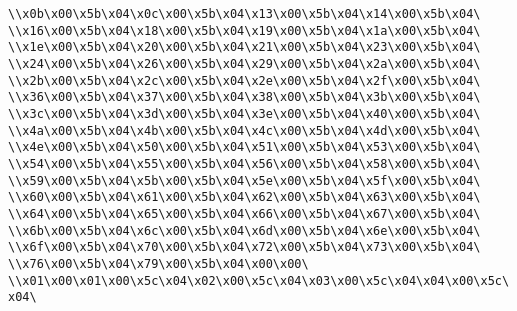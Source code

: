 \verb|\\x0b\x00\x5b\x04\x0c\x00\x5b\x04\x13\x00\x5b\x04\x14\x00\x5b\x04\|\newline
\verb|\\x16\x00\x5b\x04\x18\x00\x5b\x04\x19\x00\x5b\x04\x1a\x00\x5b\x04\|\newline
\verb|\\x1e\x00\x5b\x04\x20\x00\x5b\x04\x21\x00\x5b\x04\x23\x00\x5b\x04\|\newline
\verb|\\x24\x00\x5b\x04\x26\x00\x5b\x04\x29\x00\x5b\x04\x2a\x00\x5b\x04\|\newline
\verb|\\x2b\x00\x5b\x04\x2c\x00\x5b\x04\x2e\x00\x5b\x04\x2f\x00\x5b\x04\|\newline
\verb|\\x36\x00\x5b\x04\x37\x00\x5b\x04\x38\x00\x5b\x04\x3b\x00\x5b\x04\|\newline
\verb|\\x3c\x00\x5b\x04\x3d\x00\x5b\x04\x3e\x00\x5b\x04\x40\x00\x5b\x04\|\newline
\verb|\\x4a\x00\x5b\x04\x4b\x00\x5b\x04\x4c\x00\x5b\x04\x4d\x00\x5b\x04\|\newline
\verb|\\x4e\x00\x5b\x04\x50\x00\x5b\x04\x51\x00\x5b\x04\x53\x00\x5b\x04\|\newline
\verb|\\x54\x00\x5b\x04\x55\x00\x5b\x04\x56\x00\x5b\x04\x58\x00\x5b\x04\|\newline
\verb|\\x59\x00\x5b\x04\x5b\x00\x5b\x04\x5e\x00\x5b\x04\x5f\x00\x5b\x04\|\newline
\verb|\\x60\x00\x5b\x04\x61\x00\x5b\x04\x62\x00\x5b\x04\x63\x00\x5b\x04\|\newline
\verb|\\x64\x00\x5b\x04\x65\x00\x5b\x04\x66\x00\x5b\x04\x67\x00\x5b\x04\|\newline
\verb|\\x6b\x00\x5b\x04\x6c\x00\x5b\x04\x6d\x00\x5b\x04\x6e\x00\x5b\x04\|\newline
\verb|\\x6f\x00\x5b\x04\x70\x00\x5b\x04\x72\x00\x5b\x04\x73\x00\x5b\x04\|\newline
\verb|\\x76\x00\x5b\x04\x79\x00\x5b\x04\x00\x00\|\newline
\verb|\\x01\x00\x01\x00\x5c\x04\x02\x00\x5c\x04\x03\x00\x5c\x04\x04\x00\x5c\x04\|\newline
